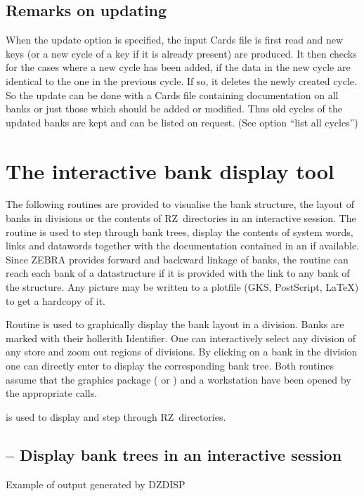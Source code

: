 \subsection*{Remarks on updating}
 
When the update option is specified, the input Cards file is
first read and new keys (or a new cycle of a key if it is already present)
are produced. 
It then checks for the cases where a new cycle has been added, if the data
in the new cycle are identical to the one in the previous cycle.
If so, it deletes the newly created cycle. 
So the update can be done
with a Cards file containing documentation on all banks or just
those which should be added or modified. 
Thus old cycles of the updated banks are kept and can be listed on request.
(See option ``list all cycles'')
 
\section{The interactive bank display tool}
\label{sec:dzdocdzdisp} 
 
The following routines are provided to visualise the bank structure,
the layout of banks in divisions or the contents of RZ~directories 
in an interactive session. 
The routine 
is used to step through bank trees, display the contents of system
words, links and datawords together with the documentation contained
in an \RZfile{} if available.
Since ZEBRA provides forward and backward linkage of banks,
the routine can reach each bank of a datastructure if it is provided
with the link to any bank of the structure. 
Any picture may be written to a plotfile 
(GKS, PostScript, LaTeX) to get a hardcopy of it.
 
Routine  is used to graphically display the bank layout
in a division. 
Banks are marked with their hollerith Identifier.
One can interactively select any division of any store and
zoom out regions of divisions. 
By clicking on a bank in the division
one can directly enter  to display the corresponding bank tree.
Both routines assume that the graphics package (\cite{bib-GKS1} or
\cite{bib-HIGZ}) and a workstation
have been opened by the appropriate calls.
 
\newpage 

 is used to display and step through RZ~directories.
\subsection[{\tt DZDISP} -- Display bank trees in an interactive session]%
           { -- Display bank trees in an interactive session}
\begin{Fighere}
\begin{center}
\caption{Example of output generated by DZDISP}
\end{center}
\end{Fighere}
 
